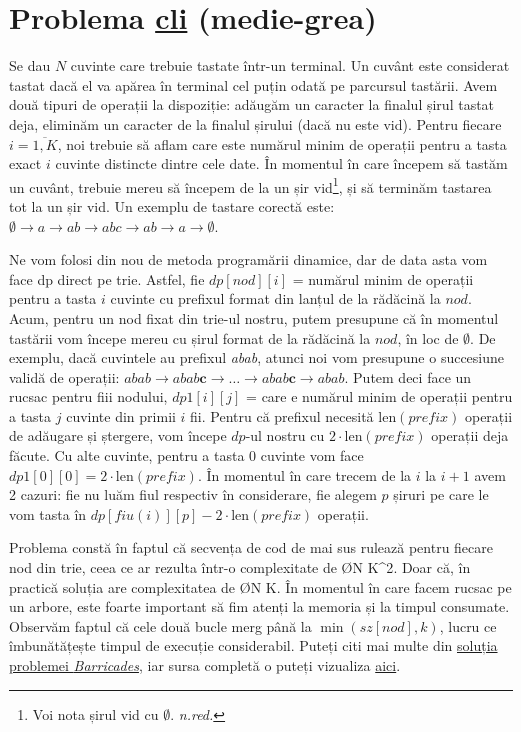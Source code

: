 \section{Problema \href{https://kilonova.ro/problems/274}{cli} (medie-grea)}
Se dau $N$ cuvinte care trebuie tastate într-un terminal. Un cuvânt este considerat tastat dacă el va apărea în terminal cel puțin odată pe parcursul tastării. Avem două tipuri de operații la dispoziție: adăugăm un caracter la finalul șirul tastat deja, eliminăm un caracter de la finalul șirului (dacă nu este vid). Pentru fiecare $i = \overline{1, K}$, noi trebuie să aflam care este numărul minim de operații pentru a tasta exact $i$ cuvinte distincte dintre cele date. În momentul în care începem să tastăm un cuvânt, trebuie mereu să începem de la un șir vid\footnote{Voi nota șirul vid cu $\emptyset$. \textit{n.red.}}, și să terminăm tastarea tot la un șir vid. Un exemplu de tastare corectă este: $\emptyset \rightarrow a \rightarrow ab \rightarrow abc \rightarrow ab \rightarrow a \rightarrow \emptyset$.

Ne vom folosi din nou de metoda programării dinamice, dar de data asta vom face dp direct pe trie. Astfel, fie $dp[nod][i]$ = numărul minim de operații pentru a tasta $i$ cuvinte cu prefixul format din lanțul de la rădăcină la $nod$. Acum, pentru un nod fixat din trie-ul nostru, putem presupune că în momentul tastării vom începe mereu cu șirul format de la rădăcină la $nod$, în loc de $\emptyset$. De exemplu, dacă cuvintele au prefixul \textit{abab}, atunci noi vom presupune o succesiune validă de operații: $abab \rightarrow abab\textbf{c} \rightarrow \dots \rightarrow abab\textbf{c} \rightarrow abab$. Putem deci face un rucsac pentru fiii nodului, $dp1[i][j]$ = care e numărul minim de operații pentru a tasta $j$ cuvinte din primii $i$ fii. Pentru că prefixul necesită $\text{len}(prefix)$ operații de adăugare și ștergere, vom începe $dp$-ul nostru cu $2 \cdot \text{len}(prefix)$ operații deja făcute. Cu alte cuvinte, pentru a tasta $0$ cuvinte vom face $dp1[0][0] = 2 \cdot \text{len}(prefix)$.
În momentul în care trecem de la $i$ la $i+1$ avem 2 cazuri: fie nu luăm fiul respectiv în considerare, fie alegem $p$ șiruri pe care le vom tasta în $dp[fiu(i)][p] - 2 \cdot \text{len}(prefix)$ operații. 

Problema constă în faptul că secvența de cod de mai sus rulează pentru fiecare nod din trie, ceea ce ar rezulta într-o complexitate de \O{N \cdot K^2}. Doar că, în practică soluția are complexitatea de \O{N \cdot K}. În momentul în care facem rucsac pe un arbore, este foarte important să fim atenți la memoria și la timpul consumate. Observăm faptul că cele două bucle merg până la $\min(sz[nod], k)$, lucru ce  îmbunătățește timpul de execuție considerabil. Puteți citi mai multe din \href{http://www.lookingforachallengethebook.com/uploads/1/4/5/5/14555448/preview-_looking_for_a_challenge.pdf}{soluția problemei \textit{Barricades}}, iar sursa completă o puteți vizualiza \href{https://kilonova.ro/submissions/140069}{aici}.
